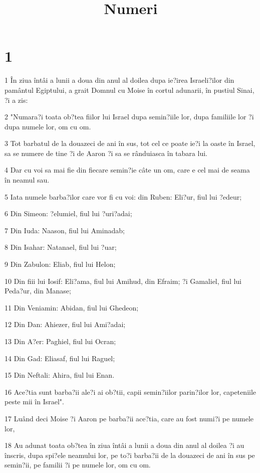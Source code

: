 

\title{Numeri}


\chapter{1}

\par 1 În ziua întâi a lunii a doua din anul al doilea dupa ie?irea Israeli?ilor din pamântul Egiptului, a grait Domnul cu Moise în cortul adunarii, în pustiul Sinai, ?i a zis:
\par 2 "Numara?i toata ob?tea fiilor lui Israel dupa semin?iile lor, dupa familiile lor ?i dupa numele lor, om cu om.
\par 3 Tot barbatul de la douazeci de ani în sus, tot cel ce poate ie?i la oaste în Israel, sa se numere de tine ?i de Aaron ?i sa se rânduiasca în tabara lui.
\par 4 Dar cu voi sa mai fie din fiecare semin?ie câte un om, care e cel mai de seama în neamul sau.
\par 5 Iata numele barba?ilor care vor fi cu voi: din Ruben: Eli?ur, fiul lui ?edeur;
\par 6 Din Simeon: ?elumiel, fiul lui ?uri?adai;
\par 7 Din Iuda: Naason, fiul lui Aminadab;
\par 8 Din Isahar: Natanael, fiul lui ?uar;
\par 9 Din Zabulon: Eliab, fiul lui Helon;
\par 10 Din fiii lui Iosif: Eli?ama, fiul lui Amihud, din Efraim; ?i Gamaliel, fiul lui Peda?ur, din Manase;
\par 11 Din Veniamin: Abidan, fiul lui Ghedeon;
\par 12 Din Dan: Ahiezer, fiul lui Ami?adai;
\par 13 Din A?er: Paghiel, fiul lui Ocran;
\par 14 Din Gad: Eliasaf, fiul lui Raguel;
\par 15 Din Neftali: Ahira, fiul lui Enan.
\par 16 Ace?tia sunt barba?ii ale?i ai ob?tii, capii semin?iilor parin?ilor lor, capeteniile peste mii în Israel".
\par 17 Luând deci Moise ?i Aaron pe barba?ii ace?tia, care au fost numi?i pe numele lor,
\par 18 Au adunat toata ob?tea în ziua întâi a lunii a doua din anul al doilea ?i au înscris, dupa spi?ele neamului lor, pe to?i barba?ii de la douazeci de ani în sus pe semin?ii, pe familii ?i pe numele lor, om cu om.
